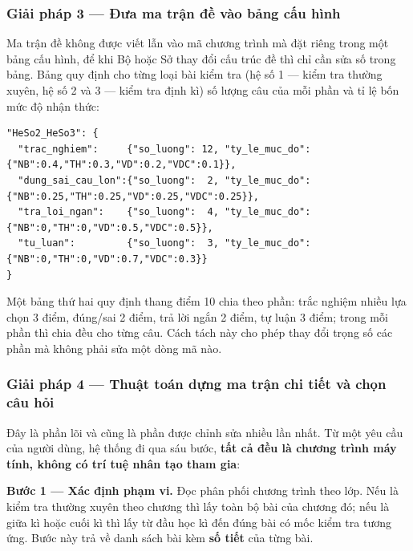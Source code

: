 
\subsubsection{Giải pháp 3 --- Đưa ma trận đề vào bảng cấu hình}

Ma trận đề không được viết lẫn vào mã chương trình mà đặt riêng trong một bảng
cấu hình, để khi Bộ hoặc Sở thay đổi cấu trúc đề thì chỉ cần sửa số trong bảng.
Bảng quy định cho từng loại bài kiểm tra (hệ số 1 --- kiểm tra thường xuyên,
hệ số 2 và 3 --- kiểm tra định kì) số lượng câu của mỗi phần và tỉ lệ bốn mức
độ nhận thức:

\begin{lstlisting}
"HeSo2_HeSo3": {
  "trac_nghiem":     {"so_luong": 12, "ty_le_muc_do": {"NB":0.4,"TH":0.3,"VD":0.2,"VDC":0.1}},
  "dung_sai_cau_lon":{"so_luong":  2, "ty_le_muc_do": {"NB":0.25,"TH":0.25,"VD":0.25,"VDC":0.25}},
  "tra_loi_ngan":    {"so_luong":  4, "ty_le_muc_do": {"NB":0,"TH":0,"VD":0.5,"VDC":0.5}},
  "tu_luan":         {"so_luong":  3, "ty_le_muc_do": {"NB":0,"TH":0,"VD":0.7,"VDC":0.3}}
}
\end{lstlisting}

Một bảng thứ hai quy định thang điểm 10 chia theo phần: trắc nghiệm nhiều lựa
chọn 3 điểm, đúng/sai 2 điểm, trả lời ngắn 2 điểm, tự luận 3 điểm; trong mỗi
phần thì chia đều cho từng câu. Cách tách này cho phép thay đổi trọng số các
phần mà không phải sửa một dòng mã nào.



\subsubsection{Giải pháp 4 --- Thuật toán dựng ma trận chi tiết và chọn câu hỏi}

Đây là phần lõi và cũng là phần được chỉnh sửa nhiều lần nhất. Từ một yêu cầu
của người dùng, hệ thống đi qua sáu bước, \textbf{tất cả đều là chương trình
máy tính, không có trí tuệ nhân tạo tham gia}:

\textbf{Bước 1 --- Xác định phạm vi.} Đọc phân phối chương trình theo lớp.
Nếu là kiểm tra thường xuyên theo chương thì lấy toàn bộ bài của chương đó;
nếu là giữa kì hoặc cuối kì thì lấy từ đầu học kì đến đúng bài có mốc kiểm tra
tương ứng. Bước này trả về danh sách bài kèm \textbf{số tiết} của từng bài.


